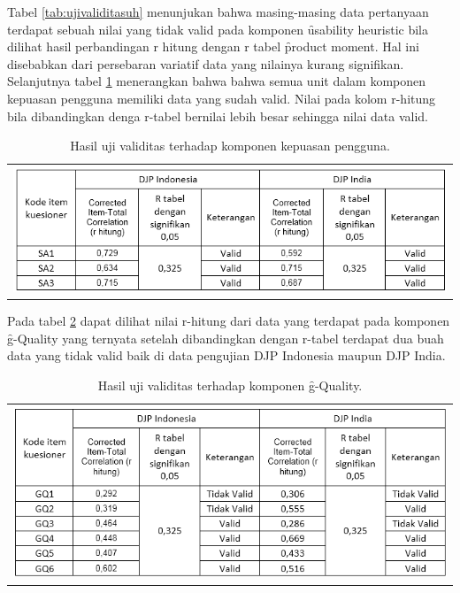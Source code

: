 Tabel \ref{tab:ujivaliditasuh} menunjukan bahwa masing-masing data pertanyaan terdapat sebuah nilai yang tidak valid pada komponen \f{usability heuristic} bila dilihat hasil perbandingan r hitung dengan r tabel \f{product moment}. Hal ini disebabkan dari persebaran variatif data yang nilainya kurang signifikan.
\newline\\
Selanjutnya tabel \ref{tab:ujivaliditassat} menerangkan bahwa bahwa semua unit dalam komponen kepuasan pengguna memiliki data yang sudah valid. Nilai pada kolom r-hitung bila dibandingkan denga r-tabel bernilai lebih besar sehingga nilai data valid.
\begin{table}
	\centering
	\caption{Hasil uji validitas terhadap komponen kepuasan pengguna.}
	\label{tab:ujivaliditassat}
	\begin{tabular}{c}
		\includegraphics[width=\textwidth]
		{pics/validitasKepuasanPengguna.PNG}
	\end{tabular}
\end{table}
Pada tabel \ref{tab:ujivaliditasgq} dapat dilihat nilai r-hitung dari data yang terdapat pada komponen \f{g-Quality} yang ternyata setelah dibandingkan dengan r-tabel terdapat dua buah data yang tidak valid baik di data pengujian DJP Indonesia maupun DJP India.
\begin{table}
	\centering
	\caption{Hasil uji validitas terhadap komponen \f{g-Quality}.}
	\label{tab:ujivaliditasgq}
	\begin{tabular}{c}
		\includegraphics[width=\textwidth]
		{pics/validitasGQuality.PNG}
	\end{tabular}
\end{table}
